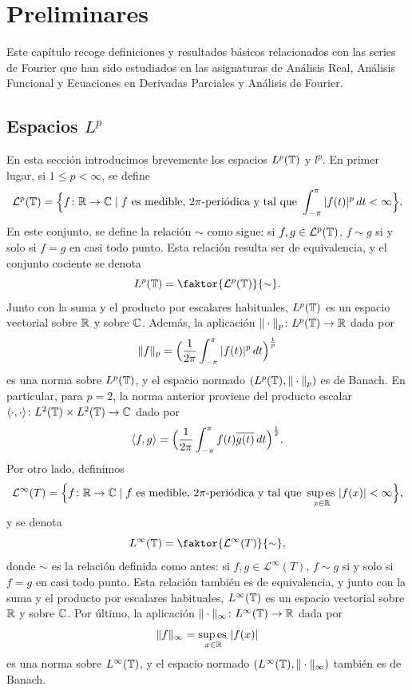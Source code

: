 \documentclass[a4paper, 12pt, oneside]{book}
\begin{document}


\chapter{Preliminares}

\setcounter{page}{1} 

Este capítulo recoge definiciones y resultados básicos relacionados con las series de Fourier que han sido estudiados en las asignaturas de Análisis Real, Análisis Funcional y Ecuaciones en Derivadas Parciales y Análisis de Fourier.

\section[Espacios \texorpdfstring{$L^p$}{Lp}]{Espacios \texorpdfstring{\boldmath$L^p$}{Lp}}

En esta sección introducimos brevemente los espacios $L^p(\mathbb T)$ y $l^p$. En primer lugar, si $1 \leq p < \infty$, se define
\[\mathcal{L}^p(\mathbb T) = \Bigl\{f \colon \mathbb R \to \mathbb C \mid f \textup{ es medible, } 2\pi\textup{-periódica y tal que } \int_{-\pi}^{\pi} |f(t)|^p \, dt < \infty \Bigr\}.\]
En este conjunto, se define la relación $\sim$ como sigue: si $f,g \in \mathcal{L}^p(\mathbb T)$, $f \sim g$ si y solo si $f = g$ en casi todo punto. Esta relación resulta ser de equivalencia, y el conjunto cociente se denota
\[L^p(\T) = \faktor{\mathcal{L}^p(\T)}{\sim}.\]
Junto con la suma y el producto por escalares habituales, $L^p(\mathbb T)$ es un espacio vectorial sobre $\mathbb R$ y sobre $\mathbb C$. Además, la aplicación $\|\cdot\|_p \colon L^p(\mathbb T) \to \mathbb R$ dada por
\[\|f\|_{p} = \Bigl(\frac{1}{2\pi}\int_{-\pi}^{\pi} |f(t)|^p \, dt\Bigr)^{\frac{1}{p}}\]
es una norma sobre $L^p(\mathbb T)$, y el espacio normado $(L^p(\mathbb T),\|\cdot\|_p)$ es de Banach. En particular, para $p=2$, la norma anterior proviene del producto escalar $\langle \cdot,\cdot\rangle \colon L^2(\mathbb T)\times L^2(\mathbb T)\to \mathbb C$ dado por
\[\langle f,g\rangle = \Bigl(\frac{1}{2\pi}\int_{-\pi}^{\pi} f(t)\overline{g(t)} \, dt\Bigr)^{\frac{1}{2}}.\]
Por otro lado, definimos
\[\mathcal{L}^\infty(T) = \Bigl\{f \colon \mathbb R \to \mathbb C \mid f \textup{ es medible, } 2\pi\textup{-periódica y tal que } \operatorname*{sup\,es\,}_{x \in \mathbb R} |f(x)| < \infty\Bigr\},\]
y se denota
\[L^\infty(\T) = \faktor{\mathcal{L}^\infty(T)}{\sim},\]
donde $\sim$ es la relación definida como antes: si $f,g \in \mathcal{L}^\infty(T)$, $f \sim g$ si y solo si $f=g$ en casi todo punto. Esta relación también es de equivalencia, y junto con la suma y el producto por escalares habituales, $L^\infty(\mathbb T)$ es un espacio vectorial sobre $\mathbb R$ y sobre $\mathbb C$. Por último, la aplicación $\|\cdot\|_\infty \colon L^\infty(\mathbb T) \to \mathbb R$ dada por
\[\|f\|_{\infty} = \operatorname*{sup\,es\,}_{x \in \mathbb R} |f(x)|\]
es una norma sobre $L^\infty(\mathbb T)$, y el espacio normado $(L^\infty(\mathbb T),\|\cdot\|_\infty)$ también es de Banach.
\end{document}

